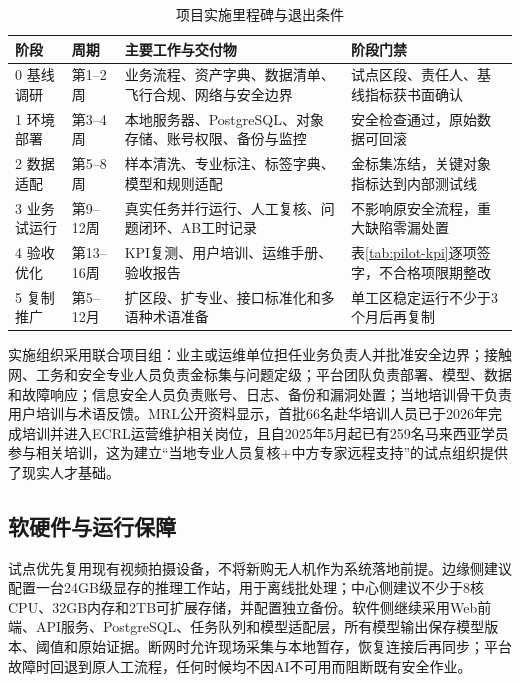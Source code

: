 \documentclass[UTF8,a4paper,zihao=-4]{ctexart}
\begin{document}
\begin{table}[H]
\centering
\caption{项目实施里程碑与退出条件}
\label{tab:implementation-plan}
\small
\begin{tabularx}{\textwidth}{p{}p{}p{}X}
\toprule
阶段 & 周期 & 主要工作与交付物 & 阶段门禁 \\
\midrule
0 基线调研 & 第1--2周 & 业务流程、资产字典、数据清单、飞行合规、网络与安全边界 & 试点区段、责任人、基线指标获书面确认 \\
1 环境部署 & 第3--4周 & 本地服务器、PostgreSQL、对象存储、账号权限、备份与监控 & 安全检查通过，原始数据可回滚 \\
2 数据适配 & 第5--8周 & 样本清洗、专业标注、标签字典、模型和规则适配 & 金标集冻结，关键对象指标达到内部测试线 \\
3 业务试运行 & 第9--12周 & 真实任务并行运行、人工复核、问题闭环、AB工时记录 & 不影响原安全流程，重大缺陷零漏处置 \\
4 验收优化 & 第13--16周 & KPI复测、用户培训、运维手册、验收报告 & 表\ref{tab:pilot-kpi}逐项签字，不合格项限期整改 \\
5 复制推广 & 第5--12月 & 扩区段、扩专业、接口标准化和多语种术语准备 & 单工区稳定运行不少于3个月后再复制 \\
\bottomrule
\end{tabularx}
\end{table}

实施组织采用联合项目组：业主或运维单位担任业务负责人并批准安全边界；接触网、工务和安全专业人员负责金标集与问题定级；平台团队负责部署、模型、数据和故障响应；信息安全人员负责账号、日志、备份和漏洞处置；当地培训骨干负责用户培训与术语反馈。MRL公开资料显示，首批66名赴华培训人员已于2026年完成培训并进入ECRL运营维护相关岗位，且自2025年5月起已有259名马来西亚学员参与相关培训\cite{mrl-training-2026}，这为建立“当地专业人员复核+中方专家远程支持”的试点组织提供了现实人才基础。

\subsection{软硬件与运行保障}

试点优先复用现有视频拍摄设备，不将新购无人机作为系统落地前提。边缘侧建议配置一台24GB级显存的推理工作站，用于离线批处理；中心侧建议不少于8核CPU、32GB内存和2TB可扩展存储，并配置独立备份。软件侧继续采用Web前端、API服务、PostgreSQL、任务队列和模型适配层，所有模型输出保存模型版本、阈值和原始证据。断网时允许现场采集与本地暂存，恢复连接后再同步；平台故障时回退到原人工流程，任何时候均不因AI不可用而阻断既有安全作业。
\end{document}
